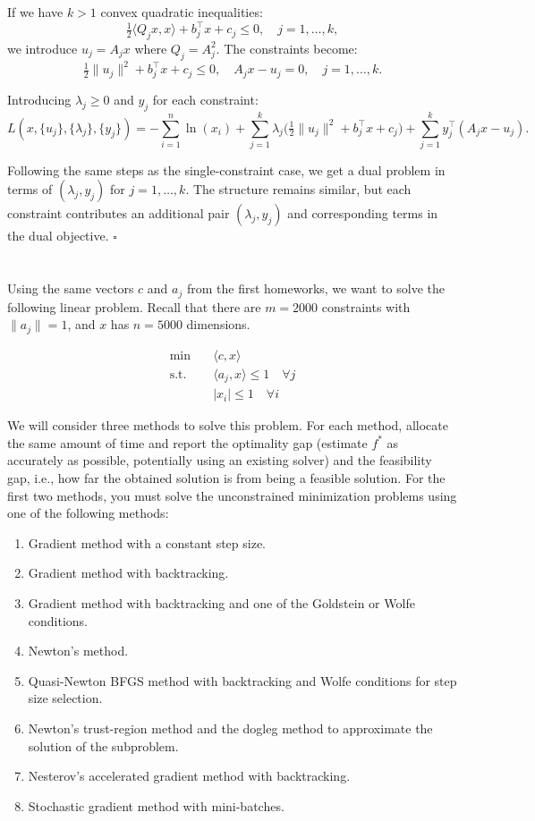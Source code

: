 \documentclass[10pt]{article}
\begin{document}
If we have $k>1$ convex quadratic inequalities:
\[
\tfrac12\langle Q_j x,x\rangle + b_j^\top x + c_j \le 0, \quad j=1,\dots,k,
\]
we introduce $u_j = A_j x$ where $Q_j = A_j^2$. The constraints become:
\[
\tfrac12 \|u_j\|^2 + b_j^\top x + c_j \le 0, \quad A_j x - u_j =0, \quad j=1,\dots,k.
\]

Introducing $\lambda_j \ge 0$ and $y_j$ for each constraint:
\[
L(x,\{u_j\},\{\lambda_j\},\{y_j\}) = -\sum_{i=1}^n \ln(x_i) + \sum_{j=1}^k \lambda_j\bigl(\tfrac12 \|u_j\|^2 + b_j^\top x + c_j\bigr) + \sum_{j=1}^k y_j^\top(A_j x - u_j).
\]

Following the same steps as the single-constraint case, we get a dual problem in terms of $(\lambda_j,y_j)$ for $j=1,\dots,k$. The structure remains similar, but each constraint contributes an additional pair $(\lambda_j,y_j)$ and corresponding terms in the dual objective. $\square$


\part{}

Using the same vectors \( c \) and \( a_j \) from the first homeworks, we want to solve the following linear problem. Recall that there are \( m = 2000 \) constraints with \( \|a_j\| = 1 \), and \( x \) has \( n = 5000 \) dimensions.

\begin{align*}
  \min \quad & \langle c, x \rangle \\
  \text{s.t.} \quad & \langle a_j, x \rangle \leq 1 \quad \forall j \\
  & |x_i| \leq 1 \quad \forall i
\end{align*}

We will consider three methods to solve this problem. For each method, allocate the same amount of time and report the optimality gap (estimate \( f^* \) as accurately as possible, potentially using an existing solver) and the feasibility gap, i.e., how far the obtained solution is from being a feasible solution. For the first two methods, you must solve the unconstrained minimization problems using one of the following methods:

\begin{enumerate}
  \item Gradient method with a constant step size.
  \item Gradient method with backtracking.
  \item Gradient method with backtracking and one of the Goldstein or Wolfe conditions.
  \item Newton's method.
  \item Quasi-Newton BFGS method with backtracking and Wolfe conditions for step size selection.
  \item Newton's trust-region method and the dogleg method to approximate the solution of the subproblem.
  \item Nesterov's accelerated gradient method with backtracking.
  \item Stochastic gradient method with mini-batches.
\end{enumerate}
\end{document}
